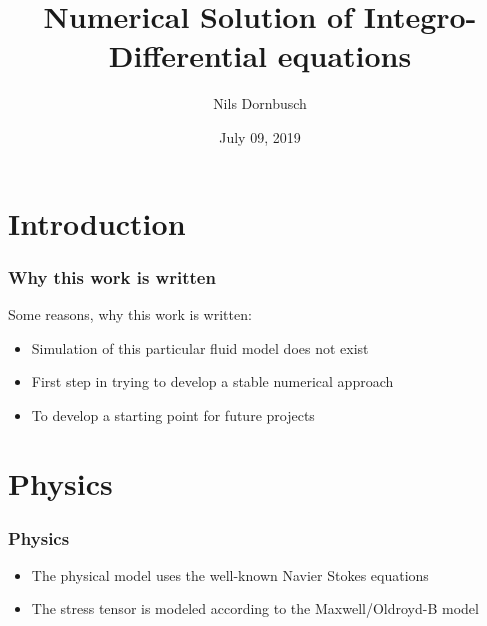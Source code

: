 \documentclass[12pt,a4paper]{beamer}
\theoremstyle{definition}
\theoremstyle{plain}
\begin{document}
    \title{ Numerical Solution of Integro-Differential equations}
    \author{Nils Dornbusch}
    \date{July 09, 2019}
    \maketitle
    \begin{frame}
    \tableofcontents[pausesections]
    \end{frame}
\section{Introduction}
\begin{frame}
    \frametitle{Why this work is written}
    Some reasons, why this work is written:
    \begin{itemize}[<+->]
        \item Simulation of this particular fluid model does not exist 
        \item First step in trying to develop a stable numerical approach
        \item To develop a starting point for future projects
    \end{itemize}
\end{frame}
\section{Physics}
    \begin{frame}
        \frametitle{Physics}
        \begin{itemize}[<+->]
            \item  The physical model uses the well-known Navier Stokes equations
            \item The stress tensor is modeled according to the Maxwell/Oldroyd-B model
        \end{itemize}
    \end{frame}
\end{document}
